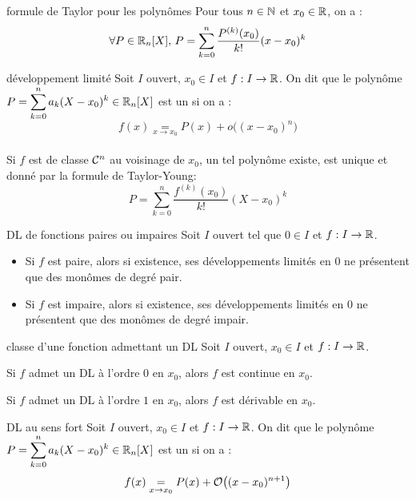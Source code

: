 \begin{adjustwidth}{-3cm}{-3cm}
\begin{proposition}{25.34}{formule de Taylor pour les polynômes}
    Pour tous $n \in \mathbb{N}$ et $x_0 \in \mathbb{R}$, on a :
    $$\forall P \in \mathbb{R}_n[X],\, P = \sum_{k=0}^{n}\frac{P^{(k)}(x_0)}{k!}(x-x_0)^k$$
\end{proposition}

\begin{definition}{25.36}{développement limité}
    Soit $I$ ouvert, $x_0 \in I$ et $f:I \to \mathbb{R}$. On dit que le polynôme $ \displaystyle P = \sum_{k=0}^{n}a_k(X - x_0)^k \in \mathbb{R}_n[X]$ est un  si on a :\\
    $$f(x) \underset{x \to x_0}{=}  P(x) + o\bigl((x-x_0)^n\bigr)$$ \\
    Si $f$ est de classe $\mathcal{C}^{n}$ au voisinage de $x_0$, un tel polynôme existe, est unique et donné par la formule de Taylor-Young:
    $$P = \sum_{k=0}^{n}\frac{f^{(k)}(x_0)}{k!}(X-x_0)^k$$
\end{definition}

\begin{proposition}{25.41}{DL de fonctions paires ou impaires}
    Soit $I$ ouvert tel que $0 \in I$ et $f:I \to \mathbb{R}$. \begin{itemize}
        \item Si $f$ est paire, alors si existence, ses développements limités en 0 ne présentent que des monômes de degré pair.
        \item Si $f$ est impaire, alors si existence, ses développements limités en 0 ne présentent que des monômes de degré impair.
    \end{itemize}
\end{proposition}

\begin{proposition}{25.42}{classe d'une fonction admettant un DL}
    Soit $I$ ouvert, $x_0 \in I$ et $f:I \to \mathbb{R}$.
    \begin{enumeratebf}
        \item Si $f$ admet un DL à l’ordre $0$ en $x_0$, alors $f$ est continue en $x_0$.
        \item Si $f$ admet un DL à l’ordre $1$ en $x_0$, alors $f$ est dérivable en $x_0$.
    \end{enumeratebf}
\end{proposition}

\begin{definition}{25.44}{DL au sens fort}
    Soit $I$ ouvert, $x_0 \in I$ et $f:I \to \mathbb{R}$. On dit que le polynôme $ \displaystyle P = \sum_{k=0}^{n}a_k(X - x_0)^k \in \mathbb{R}_n[X]$ est un  si on a :\\
    $$f(x) \underset{x \to x_0}{=}  P(x) + \mathcal{O}\bigl((x-x_0)^{n+1}\bigr)$$
\end{definition}


\end{adjustwidth}
